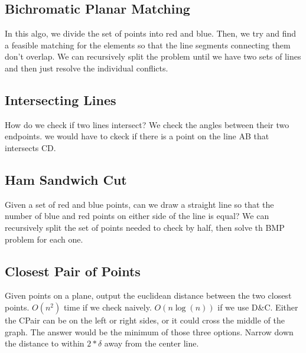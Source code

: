 \documentclass[portrait,10pt,a4paper]{article}
\begin{document}
\begin{multicols*}{3}
\subsection{Bichromatic Planar Matching}
In this algo, we divide the set of points into red and blue. Then, we try and find a feasible matching for the elements
so that the line segments connecting them don't overlap. We can recursively split the problem until we have two sets
of lines and then just resolve the individual conflicts.

\subsection{Intersecting Lines}
How do we check if two lines intersect? We check the angles between their two endpoints. we would have to ckeck if there
is a point on the line AB that intersects CD.
\subsection{Ham Sandwich Cut}
Given a set of red and blue points, can we draw a straight line so that the number of blue and red points on either
side of the line is equal? We can recursively split the set of points needed to check by half, then solve th BMP problem
for each one.
\subsection{Closest Pair of Points}
Given points on a plane, output the euclidean distance between the two closest points. $O(n^{2})$ time if we check naively.
$O(n\log(n))$ if we use D\&C. Either the CPair can be on the left or right sides, or it could cross the middle of the graph.
The answer would be the minimum of those three options. Narrow down the distance to within $2*\delta$ away from the center
line.
\end{multicols*}
         
\end{document}

